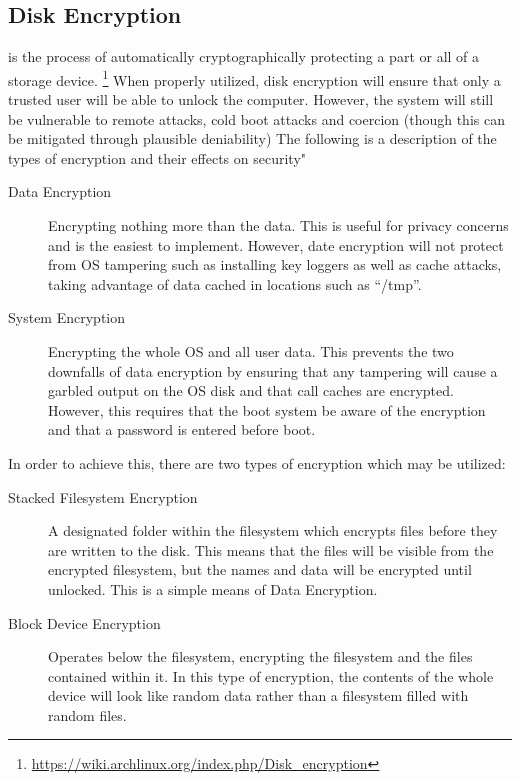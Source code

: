 \documentclass[a4paper,11pt]{report}
\begin{document}
		\subsection{Disk Encryption}
			is the process of automatically cryptographically protecting a part or all of a storage device.
			\footnote{\url{https://wiki.archlinux.org/index.php/Disk\_encryption}}
			When properly utilized, disk encryption will ensure that only a trusted user will be able to unlock the computer. 
			However, the system will still be vulnerable to remote attacks, cold boot attacks and coercion (though this can be mitigated through plausible deniability)
			The following is a description of the types of encryption and their effects on security"
			\begin{description}
				\item[Data Encryption] Encrypting nothing more than the data. 
					This is useful for privacy concerns and is the easiest to implement. 
					However, date encryption will not protect from OS tampering such as installing key loggers as well as cache attacks, taking advantage of data cached in locations such as ``/tmp''.
				\item[System Encryption] Encrypting the whole OS and all user data. 
					This prevents the two downfalls of data encryption by ensuring that any tampering will cause a garbled output on the OS disk and that call caches are encrypted. 
					However, this requires that the boot system be aware of the encryption and that a password is entered before boot. 
			\end{description}
			In order to achieve this, there are two types of encryption which may be utilized:
			\begin{description}
				\item[Stacked Filesystem Encryption] A designated folder within the filesystem which encrypts files before they are written to the disk. 
					This means that the files will be visible from the encrypted filesystem, but the names and data will be encrypted until unlocked. 
					This is a simple means of Data Encryption. 
				\item[Block Device Encryption] Operates below the filesystem, encrypting the filesystem and the files contained within it. 
					In this type of encryption, the contents of the whole device will look like random data rather than a filesystem filled with random files. 
			\end{description}
\end{document}
